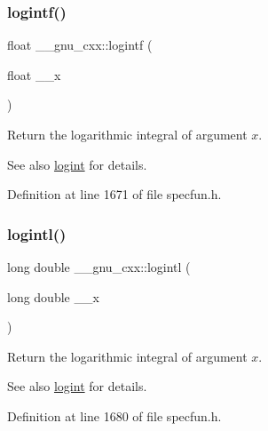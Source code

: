 \subsubsection{\texorpdfstring{logintf()}{logintf()}}
{\footnotesize\ttfamily float \+\_\+\+\_\+gnu\+\_\+cxx\+::logintf (\begin{DoxyParamCaption}\item[{float}]{\+\_\+\+\_\+x }\end{DoxyParamCaption})\hspace{0.3cm}{\ttfamily [inline]}}

Return the logarithmic integral of argument $ x $.

\begin{DoxySeeAlso}{See also}
\hyperlink{group__gnu__math__spec__func_ga1c0fe0f4cb72041f24db82dc7e47df11}{logint} for details. 
\end{DoxySeeAlso}


Definition at line 1671 of file specfun.\+h.

\mbox{\label{group__gnu__math__spec__func_gab17f5cadc8f77ba2666d0d5ecc78de5d}} 
\subsubsection{\texorpdfstring{logintl()}{logintl()}}
{\footnotesize\ttfamily long double \+\_\+\+\_\+gnu\+\_\+cxx\+::logintl (\begin{DoxyParamCaption}\item[{long double}]{\+\_\+\+\_\+x }\end{DoxyParamCaption})\hspace{0.3cm}{\ttfamily [inline]}}

Return the logarithmic integral of argument $ x $.

\begin{DoxySeeAlso}{See also}
\hyperlink{group__gnu__math__spec__func_ga1c0fe0f4cb72041f24db82dc7e47df11}{logint} for details. 
\end{DoxySeeAlso}


Definition at line 1680 of file specfun.\+h.

\mbox{\label{group__gnu__math__spec__func_ga5a5d9c5e7ab822f84578415be8609f49}} 
